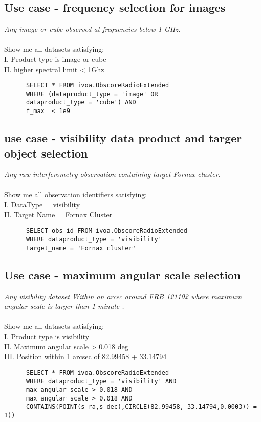 \subsection{Use case - frequency selection  for images }
\textit{Any image or cube observed at frequencies below 1 GHz.}\\ \\
Show me all datasets satisfying:\\
I. Product type is image or cube \\
II. higher spectral limit < 1Ghz
\begin{verbatim}
      SELECT * FROM ivoa.ObscoreRadioExtended
      WHERE (dataproduct_type = 'image' OR
      dataproduct_type = 'cube') AND
      f_max  < 1e9
\end{verbatim}


 

\subsection{ use case - visibility data product and targer object selection }
\textit{Any raw interferometry observation containing target Fornax cluster.}\\
\\
Show me all  observation identifiers satisfying:\\
I. DataType = visibility \\
II. Target Name = Fornax Cluster \\
\begin{verbatim}
      SELECT obs_id FROM ivoa.ObscoreRadioExtended
      WHERE dataproduct_type = 'visibility'
      target_name = 'Fornax cluster'
\end{verbatim}





\subsection{Use case - maximum angular scale selection}
\textit{Any visibility dataset Within an arcec around FRB 121102  where  maximum angular scale is larger than 1 minute .}\\ \\
Show me all datasets satisfying:\\
I. Product type is visibility \\
II. Maximum angular scale  >  0.018 deg \\
III. Position within 1 arcsec of 82.99458 + 33.14794
\begin{verbatim}
      SELECT * FROM ivoa.ObscoreRadioExtended
      WHERE dataproduct_type = 'visibility' AND
      max_angular_scale > 0.018 AND
      max_angular_scale > 0.018 AND
      CONTAINS(POINT(s_ra,s_dec),CIRCLE(82.99458, 33.14794,0.0003)) = 1))
\end{verbatim}

